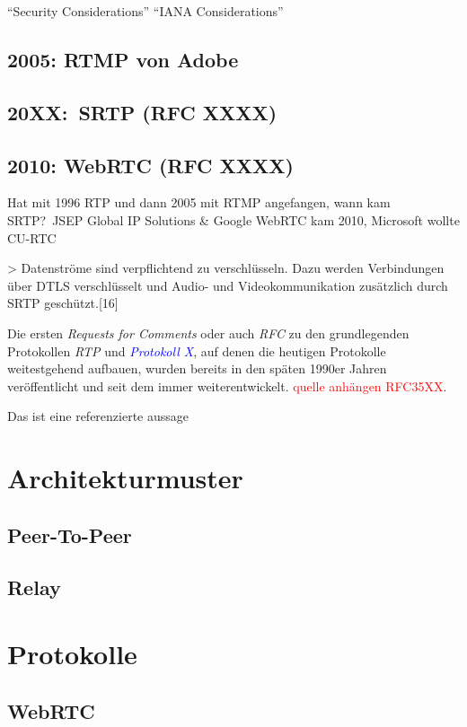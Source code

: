 \documentclass[journal]{IEEEtran}
\begin{document}
``Security Considerations''
``IANA Considerations''

\subsection{2005: RTMP von Adobe}
\subsection{20XX:\ SRTP (RFC XXXX)}
\subsection{2010: WebRTC (RFC XXXX)}

Hat mit 1996 RTP und dann 2005 mit RTMP angefangen, wann kam SRTP?\ JSEP
Global IP Solutions \& Google WebRTC kam 2010, Microsoft wollte CU-RTC

> Datenströme sind verpflichtend zu verschlüsseln. Dazu werden Verbindungen über DTLS verschlüsselt und Audio- und Videokommunikation zusätzlich durch SRTP geschützt.[16]


Die ersten \textit{Requests for Comments} oder auch \textit{RFC} zu
den grundlegenden Protokollen \textit{RTP} und
\textit{\textcolor{blue}{Protokoll X}}, auf denen die heutigen Protokolle
weitestgehend aufbauen, wurden bereits in den späten 1990er Jahren
veröffentlicht und seit dem immer weiterentwickelt. \textcolor{red}{quelle
anhängen RFC35XX}.

\lipsum[1-3][3-30]


Das ist eine referenzierte aussage\cite{WebRTC}

\section{Architekturmuster}
\lipsum[1-4][1-10]

\subsection{Peer-To-Peer}
\lipsum[1-2][2-3]
\subsection{Relay}
\lipsum[1-3][3-30]

\section{Protokolle}
\lipsum[1-2][2-3]
\subsection{WebRTC}
\lipsum[1-4][1-10]
\end{document}
